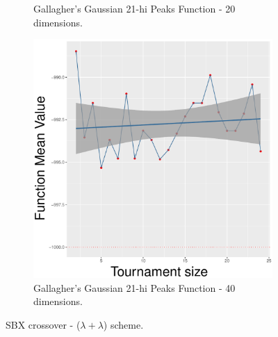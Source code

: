 \begin{figure}[!t]
\begin{subfigure}[b]{0.33\textwidth}
		\caption{Gallagher's Gaussian 21-hi Peaks Function - 20 dimensions.}
	\end{subfigure}
	\begin{subfigure}[b]{0.33\textwidth}
		\centering
		\includegraphics[width=\textwidth]{img/2n2n-40D/multimodal_2n2n_22_dim_40.pdf}
		\caption{Gallagher's Gaussian 21-hi Peaks Function - 40 dimensions.}
	\end{subfigure}
	\caption{SBX crossover - ($\lambda + \lambda$) scheme.}
	\label{sbx-22-B}
\end{figure}


